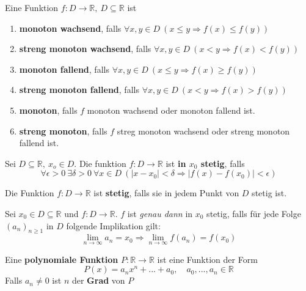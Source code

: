 \documentclass[8pt,a4paper,twocolumn,table]{extarticle}
\newcommand{\R}{\mathbb{R}}
\newcommand{\seq}[1]{\left( #1_n \right)_{n \ge 1}}
\begin{document}
\begin{definition}{3.2}
    Eine Funktion $f : D \to \R,\ D \subseteq \R$ ist
    \begin{enumerate}
        \item \textbf{monoton wachsend}, falls $\forall x,y \in D\ \left( x \le y \Rightarrow f(x) \le f(y) \right)$
        \item \textbf{streng monoton wachsend}, falls $\forall x,y \in D\ \left( x < y \Rightarrow f(x) < f(y) \right)$
        \item \textbf{monoton fallend}, falls $\forall x,y \in D\ \left( x \le y \Rightarrow f(x) \ge f(y) \right)$
        \item \textbf{streng monoton fallend}, falls $\forall x,y \in D\ \left( x < y \Rightarrow f(x) > f(y) \right)$
        \item \textbf{monoton}, falls $f$ monoton wachsend oder monoton fallend ist.
        \item \textbf{streng monoton}, falls $f$ streg monoton wachsend oder streng monoton fallend ist.
    \end{enumerate}
\end{definition}

\begin{definition}{3.4}
    Sei $D \subseteq \R,\ x_o \in D$. Die funktion $f: D \to \R$ ist \textbf{in $x_0$ stetig}, falls
    \[ \forall \epsilon > 0\ \exists \delta > 0\ \forall x \in D\ \left( \left| x - x_0 \right| < \delta \Rightarrow \left| f(x) - f(x_0) \right| < \epsilon \right) \]
\end{definition}

\begin{definition}{3.5}
    Die Funktion $f: D \to \R$ ist \textbf{stetig}, falls sie in jedem Punkt von $D$ stetig ist.
\end{definition}

\begin{satz}{3.7}
    Sei $x_0 \in D \subseteq \R$ und $f: D \to \R$.
    $f$ ist \textit{genau dann} in $x_0$ stetig, falls für jede Folge $\seq{a}$ in $D$ folgende Implikation gilt:
    \[ \lim_{n \to \infty} a_n = x_0 \Rightarrow \lim_{n \to \infty} f(a_n) = f(x_0) \]
\end{satz}

\begin{definition}{3.9}
    Eine \textbf{polynomiale Funktion} $P: \R \to \R$ ist eine Funktion der Form
    \[ P(x) = a_n x^n + ... + a_0, \quad a_0, ..., a_n \in \R \]
    Falls $a_n \ne 0$ ist $n$ der \textbf{Grad} von $P$
\end{definition}
\end{document}
